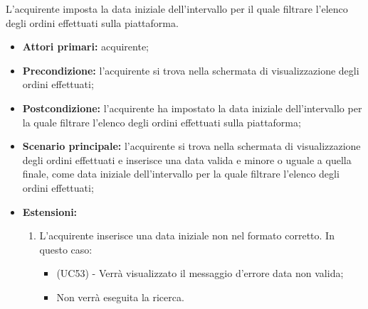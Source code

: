 \resetSubUC

L'acquirente imposta la data iniziale dell'intervallo per il quale filtrare l'elenco degli ordini effettuati sulla piattaforma.
\begin{itemize}
    \item \textbf{Attori primari:} acquirente;
    \item \textbf{Precondizione:} l'acquirente si trova nella schermata di visualizzazione degli ordini effettuati;
    \item \textbf{Postcondizione:} l'acquirente ha impostato la data iniziale dell'intervallo per la quale filtrare l'elenco degli ordini effettuati sulla piattaforma;
    \item \textbf{Scenario principale:} l'acquirente si trova nella schermata di visualizzazione degli ordini effettuati e inserisce una data valida e minore o uguale a quella finale, come data iniziale dell'intervallo per la quale filtrare l'elenco degli ordini effettuati;
    \item \textbf{Estensioni:}
    \begin{enumerate}[label=\lett]
        \item L'acquirente inserisce una data iniziale non nel formato corretto. In questo caso:
        \begin{itemize}
            \item (UC53) - Verrà visualizzato il messaggio d'errore data non valida;
            \item Non verrà eseguita la ricerca.
        \end{itemize} 
    \end{enumerate}
\end{itemize}

